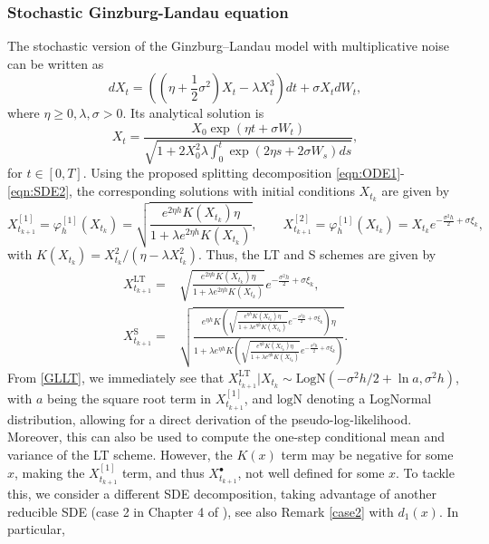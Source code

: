 \documentclass[a4paper,12pt]{article}
\numberwithin{equation}{section}
\theoremstyle{plain}
\theoremstyle{definition}
\begin{document}
\begin{appendix}
\subsubsection{Stochastic Ginzburg-Landau equation}
The stochastic version of the Ginzburg–Landau model with multiplicative noise can be written as \cite{hutzenthaler_strong_2011}
\begin{equation}\label{eqn:Ginzburg-Landau}
    dX_t=\left((\eta+\frac{1}{2}\sigma^2)X_t-\lambda X_t^3\right)dt+\sigma X_t dW_t,
\end{equation}
where $\eta\geq 0,\lambda,\sigma>0$. Its analytical solution is \cite{kloeden_numerical_1992}
\begin{equation*}
    X_t=\frac{X_0 \exp \left(\eta t+\sigma W_t\right)}{\sqrt{1+2 X_0^2 \lambda \int_0^t \exp \left(2 \eta s+2 \sigma W_s\right) d s}},
\end{equation*}
for $t\in [0,T]$. Using the proposed splitting decomposition \eqref{eqn:ODE1}-\eqref{eqn:SDE2}, the corresponding solutions with initial conditions $X_{t_k}$ are given by
\[
X^{[1]}_{t_{k+1}}=\varphi^{[1]}_h(X_{t_k})=\sqrt{\frac{e^{2\eta h}K(X_{t_k})\eta }{1+\lambda e^{2\eta h}K(X_{t_k})}}, \qquad
X^{[2]}_{t_{k+1}}=\varphi^{[1]}_h(X_{t_k})=X_{t_k}e^{-\frac{\sigma^2h}{2}+\sigma \xi_k},
\]
with $K(X_{t_k})=X^2_{t_k}/(\eta -\lambda X^2_{t_k})$. Thus, the LT and S schemes are given by
\begin{align}
\label{GLLT}X^{\textrm{LT}}_{t_{k+1}}=&\sqrt{\frac{e^{2\eta h}K(X_{t_k})\eta }{1+\lambda e^{2\eta h}K(X_{t_k})}}e^{-\frac{\sigma^2h}{2}+\sigma \xi_k},\\
    X^{\textrm{S}}_{t_{k+1}}=&\sqrt{\frac{e^{\eta h}K(\sqrt{\frac{e^{\eta h}K(X_{t_k})\eta }{1+\lambda e^{\eta h}K(X_{t_k})}}e^{-\frac{\sigma^2h}{2}+\sigma 
    \xi_k})\eta }{1+\lambda e^{\eta h}K(\sqrt{\frac{e^{\eta h}K(X_{t_k})\eta }{1+\lambda e^{\eta h}K(X_{t_k})}}e^{-\frac{\sigma^2h}{2}+\sigma \xi_k})}}.
\end{align}
From \eqref{GLLT}, we immediately see that $X_{t_{k+1}}^{\textrm{LT}}|X_{t_k}\sim \textrm{LogN}(-\sigma^2h/2+\ln a,\sigma^2h)$, with $a$ being the square root term in $X^{[1]}_{t_{k+1}}$, and $\textrm{logN}$ denoting a LogNormal distribution, allowing for a direct derivation of the pseudo-log-likelihood. Moreover, this can also be used to compute the one-step conditional mean and variance of the LT scheme. 
However, the $K(x)$ term may be negative for some $x$, making the $X^{[1]}_{t_{k+1}}$ term, and thus $X^\bullet_{t_{k+1}}$, not well defined for some $x$. To tackle this, we consider a different SDE decomposition, taking advantage of another reducible SDE (case 2 in Chapter 4 of \cite{kloeden_numerical_1992}), see also Remark \ref{case2} with $d_1(x)$. In particular, 

\end{appendix}
\end{document}
